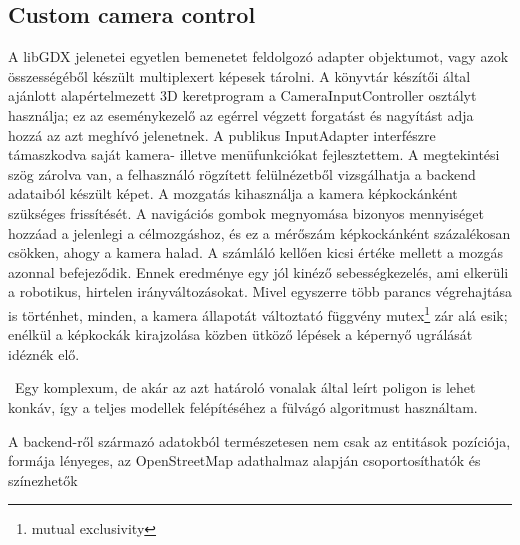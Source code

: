\subsection{Custom camera control}

A libGDX jelenetei egyetlen bemenetet feldolgozó adapter objektumot, vagy azok összességéből készült multiplexert képesek tárolni. A könyvtár készítői által ajánlott alapértelmezett 3D keretprogram\cite{basic3DlibGDX} a CameraInputController osztályt használja; ez az eseménykezelő az egérrel végzett forgatást és nagyítást adja hozzá az azt meghívó jelenetnek.
A publikus InputAdapter interfészre támaszkodva saját kamera- illetve menüfunkciókat fejlesztettem. A megtekintési szög zárolva van, a felhasználó rögzített felülnézetből vizsgálhatja a backend adataiból készült képet. A mozgatás kihasználja a kamera képkockánként szükséges frissítését. A navigációs gombok megnyomása bizonyos mennyiséget hozzáad a jelenlegi a célmozgáshoz, és ez a mérőszám képkockánként százalékosan csökken, ahogy a kamera halad. A számláló kellően kicsi értéke mellett a mozgás azonnal befejeződik.
Ennek eredménye egy jól kinéző sebességkezelés, ami elkerüli a robotikus, hirtelen irányváltozásokat. Mivel egyszerre több parancs végrehajtása is történhet, minden, a kamera állapotát változtató függvény mutex\footnote{mutual exclusivity} zár alá esik; enélkül a képkockák kirajzolása közben ütköző lépések a képernyő ugrálását idéznék elő.

\
 Egy komplexum, de akár az azt határoló vonalak által leírt poligon is lehet konkáv, így a teljes modellek felépítéséhez a fülvágó algoritmust használtam.

A backend-ről származó adatokból természetesen nem csak az entitások pozíciója, formája lényeges, az OpenStreetMap adathalmaz alapján csoportosíthatók és színezhetők  
